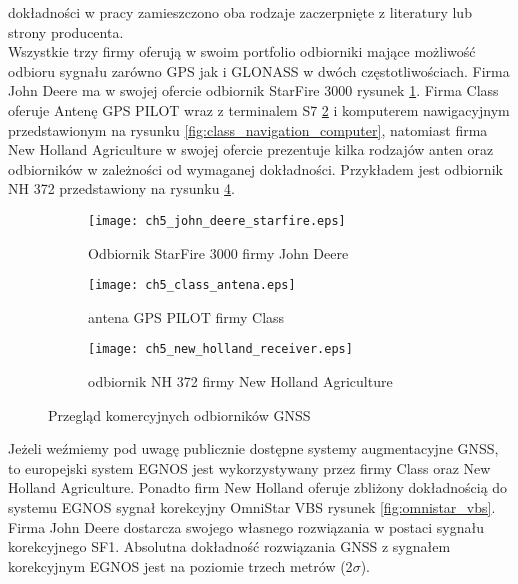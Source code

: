 dokładności w pracy zamieszczono oba rodzaje zaczerpnięte z literatury lub strony producenta.\\
\indent Wszystkie trzy firmy oferują w swoim portfolio odbiorniki mające możliwość odbioru sygnału zarówno GPS jak i GLONASS w dwóch częstotliwościach.
Firma John Deere ma w swojej ofercie odbiornik StarFire 3000 rysunek \ref{fig:john_deere_starfire}. Firma Class oferuje Antenę GPS PILOT wraz z terminalem S7
\ref{fig:class_antena} i komputerem nawigacyjnym przedstawionym na rysunku \ref{fig:class_navigation_computer}, natomiast 
firma New Holland Agriculture w swojej ofercie prezentuje kilka rodzajów anten oraz odbiorników w zależności od wymaganej dokładności. Przykładem jest odbiornik 
NH 372 przedstawiony na rysunku \ref{fig:new_holland_nh372}.
\begin{figure}[H]
\centering
        \begin{subfigure}{0.3\textwidth}
                \centering
                \texttt{[image: ch5\_john\_deere\_starfire.eps]}
                \caption{Odbiornik StarFire 3000 firmy John Deere}
                \label{fig:john_deere_starfire}
        \end{subfigure}
        \begin{subfigure}{0.3\textwidth}
                \centering
                \texttt{[image: ch5\_class\_antena.eps]}
                \caption{antena GPS PILOT firmy Class}
                \label{fig:class_antena}
        \end{subfigure}
        \begin{subfigure}{0.3\textwidth}
                \centering
                \texttt{[image: ch5\_new\_holland\_receiver.eps]}
                \caption{odbiornik NH 372 firmy New Holland Agriculture}
                \label{fig:new_holland_nh372}
        \end{subfigure}
\caption{Przegląd komercyjnych odbiorników GNSS}
\end{figure}
\indent Jeżeli weźmiemy pod uwagę publicznie dostępne systemy augmentacyjne GNSS, to europejski system EGNOS jest wykorzystywany 
przez firmy Class oraz New Holland Agriculture. Ponadto firm New Holland oferuje zbliżony dokładnością do systemu EGNOS sygnał korekcyjny OmniStar VBS rysunek
\ref{fig:omnistar_vbs}. Firma John Deere dostarcza swojego własnego rozwiązania w postaci sygnału 
korekcyjnego SF1. Absolutna dokładność rozwiązania GNSS z sygnałem korekcyjnym EGNOS jest na poziomie trzech metrów (2$\sigma$).
